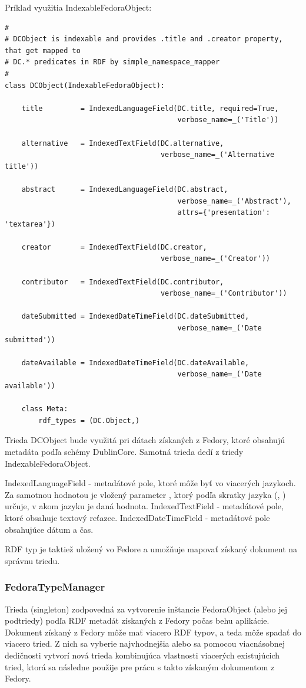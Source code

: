 \documentclass[thesis=M,slovak]{FITthesis}[2013/05/06]
\begin{document}
Príklad využitia IndexableFedoraObject:
\begin{lstlisting}[frame=single] 
#
# DCObject is indexable and provides .title and .creator property, that get mapped to
# DC.* predicates in RDF by simple_namespace_mapper
#
class DCObject(IndexableFedoraObject):

    title         = IndexedLanguageField(DC.title, required=True,
                                         verbose_name=_('Title'))

    alternative   = IndexedTextField(DC.alternative,
                                     verbose_name=_('Alternative title'))

    abstract      = IndexedLanguageField(DC.abstract,
                                         verbose_name=_('Abstract'),
                                         attrs={'presentation': 'textarea'})

    creator       = IndexedTextField(DC.creator,
                                     verbose_name=_('Creator'))

    contributor   = IndexedTextField(DC.contributor,
                                     verbose_name=_('Contributor'))

    dateSubmitted = IndexedDateTimeField(DC.dateSubmitted,
                                         verbose_name=_('Date submitted'))

    dateAvailable = IndexedDateTimeField(DC.dateAvailable,
                                         verbose_name=_('Date available'))

    class Meta:
        rdf_types = (DC.Object,)
\end{lstlisting}

Trieda DCObject bude využitá pri dátach získaných z Fedory, ktoré obsahujú metadáta podľa schémy DublinCore. Samotná trieda dedí z triedy IndexableFedoraObject.

IndexedLanguageField - metadátové pole, ktoré môže byť vo viacerých jazykoch. Za samotnou hodnotou je vložený parameter , ktorý podľa skratky jazyka (, ) určuje, v akom jazyku je daná hodnota.
IndexedTextField - metadátové pole, ktoré obsahuje textový reťazec.
IndexedDateTimeField - metadátové pole obsahujúce dátum a čas.

RDF typ je taktiež uložený vo Fedore a umožňuje mapovať získaný dokument na správnu triedu.

\subsubsection{FedoraTypeManager}
Trieda (singleton) zodpovedná za vytvorenie inštancie FedoraObject (alebo jej podtriedy) podľa RDF metadát získaných z Fedory počas behu aplikácie. Dokument získaný z Fedory môže mať viacero RDF typov, a teda môže spadať do viacero tried. Z nich sa vyberie najvhodnejšia alebo sa pomocou viacnásobnej dedičnosti vytvorí nová trieda kombinujúca vlastnosti viacerých existujúcich tried,  ktorá sa následne použije pre prácu s takto získaným dokumentom z Fedory.
\end{document}
